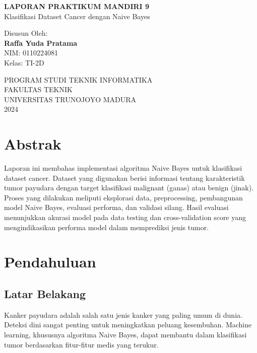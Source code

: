 \documentclass[12pt,a4paper]{article}
\begin{document}
\begin{titlepage}
    \centering
    \vspace*{2cm}
    
    {\LARGE\bfseries LAPORAN PRAKTIKUM MANDIRI 9\\}
    \vspace{0.5cm}
    {\Large Klasifikasi Dataset Cancer dengan Naive Bayes\\}
    \vspace{2cm}
    
    {\large Disusun Oleh:\\}
    \vspace{0.5cm}
    {\Large\bfseries Raffa Yuda Pratama\\}
    {\large NIM: 0110224081\\}
    {\large Kelas: TI-2D\\}
    \vspace{3cm}
    
    {\large PROGRAM STUDI TEKNIK INFORMATIKA\\}
    {\large FAKULTAS TEKNIK\\}
    {\large UNIVERSITAS TRUNOJOYO MADURA\\}
    {\large 2024\\}
\end{titlepage}

\section*{Abstrak}
Laporan ini membahas implementasi algoritma Naive Bayes untuk klasifikasi dataset cancer. Dataset yang digunakan berisi informasi tentang karakteristik tumor payudara dengan target klasifikasi malignant (ganas) atau benign (jinak). Proses yang dilakukan meliputi eksplorasi data, preprocessing, pembangunan model Naive Bayes, evaluasi performa, dan validasi silang. Hasil evaluasi menunjukkan akurasi model pada data testing dan cross-validation score yang mengindikasikan performa model dalam memprediksi jenis tumor.

\newpage
\tableofcontents
\newpage

\section{Pendahuluan}

\subsection{Latar Belakang}
Kanker payudara adalah salah satu jenis kanker yang paling umum di dunia. Deteksi dini sangat penting untuk meningkatkan peluang kesembuhan. Machine learning, khususnya algoritma Naive Bayes, dapat membantu dalam klasifikasi tumor berdasarkan fitur-fitur medis yang terukur.
\end{document}
